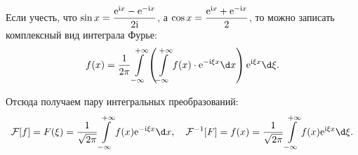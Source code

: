 Если учесть, что \( \displaystyle \sin x = \frac{\mathrm{e}^{\mathrm{i} x} - \mathrm{e}^{-\mathrm{i} x}}{2\mathrm{i}} \), а
\( \displaystyle \cos x = \frac{\mathrm{e}^{\mathrm{i} x} + \mathrm{e}^{-\mathrm{i} x}}{2} \), то можно записать
комплексный вид интеграла Фурье:
\[
    f(x) = \frac{1}{2\pi}\int\limits_{-\infty}^{+\infty} \left(
    \int\limits_{-\infty}^{+\infty} f(x)\cdot\e^{-\i\xi x}\d x\right)
    \e^{\i\xi x}\d\xi.
\]

Отсюда получаем пару интегральных преобразований:
\[
    \mathcal{F}[f] = F(\xi) = \frac{1}{\sqrt{2\pi}}
    \int\limits_{-\infty}^{+\infty} f(x)\e^{-\i\xi x}\d x, \quad
    \mathcal{F}^{-1}[F] = f(x) = \frac{1}{\sqrt{2\pi}}
    \int\limits_{-\infty}^{+\infty} f(x)\e^{\i\xi x}\d\xi.
\]
\newpage
